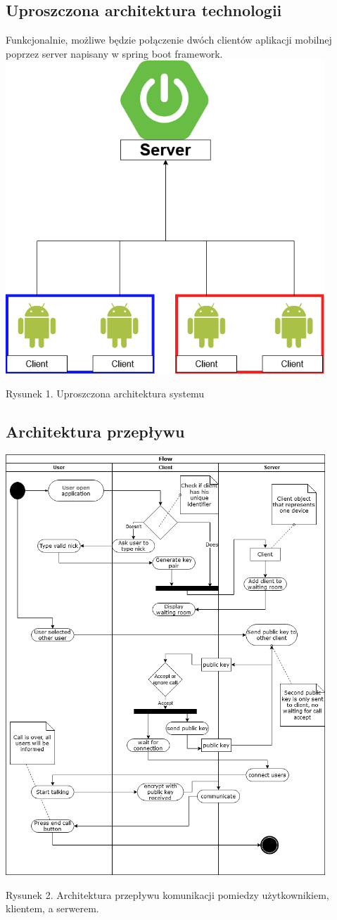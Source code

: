 \subsection{Uproszczona architektura technologii}
\tab Funkcjonalnie, możliwe będzie połączenie dwóch clientów aplikacji mobilnej poprzez server napisany w spring boot framework.\\
\includegraphics[width=12cm]{images/simple architecture.png}
\begin{center}
	\footnotesize
	Rysunek 1. Uproszczona architektura systemu
\end{center}
\subsection{Architektura przepływu}
\includegraphics[width=12cm]{images/flow.png}
\begin{center}
	\footnotesize
	Rysunek 2. Architektura przepływu komunikacji pomiedzy użytkownikiem, klientem, a serwerem.
\end{center}